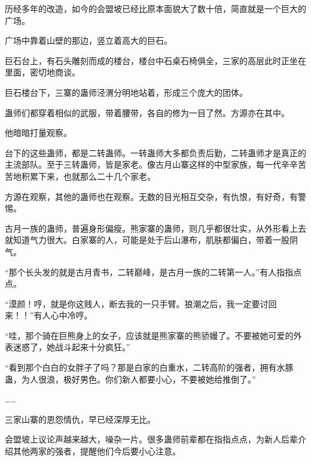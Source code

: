 \begin{this_body}
历经多年的改造，如今的会盟坡已经比原本面貌大了数十倍，简直就是一个巨大的广场。

广场中靠着山壁的那边，竖立着高大的巨石。

巨石台上，有石头雕刻而成的楼台，楼台中石桌石椅俱全，三家的高层此时正坐在里面，密切地商谈。

巨石楼台下，三寨的蛊师泾渭分明地站着，形成三个庞大的团体。

蛊师们都穿着相似的武服，带着腰带，各自的修为一目了然。方源亦在其中。

他暗暗打量观察。

台下的这些蛊师，都是二转蛊师。一转蛊师大多都负责后勤，二转蛊师才是真正的主流部队。至于三转蛊师，皆是家老。像古月山寨这样的中型家族，每一代辛辛苦苦地积累下来，也就那么二十几个家老。

方源在观察，其他的蛊师也在观察。无数的目光相互交杂，有仇恨，有好奇，有警惕。

古月一族的蛊师，普遍身形偏瘦。熊家寨的蛊师，则几乎都很壮实，从外形看上去就知道气力很大。白家寨的人，可能是处于后山瀑布，肌肤都偏白，带着一股阴气。

“那个长头发的就是古月青书，二转巅峰，是古月一族的二转第一人。”有人指指点点。

“漠颜！哼，就是你这贱人，断去我的一只手臂。狼潮之后，我一定要讨回来！！”有人心中冷哼。

“哇，那个骑在巨熊身上的女子，应该就是熊家寨的熊骄嫚了。不要被她可爱的外表迷惑了，她战斗起来十分疯狂。”

“看到那个白白的女胖子了吗？那是白家的白重水，二转高阶的强者，拥有水豚蛊，为人很浪，极好男色。你们新人都要小心，不要被她给推倒了。”

……

三家山寨的恩怨情仇，早已经深厚无比。

会盟坡上议论声越来越大，噪杂一片。很多蛊师前辈都在指指点点，为新人后辈介绍其他两家的强者，提醒他们今后要小心注意。

\end{this_body}

